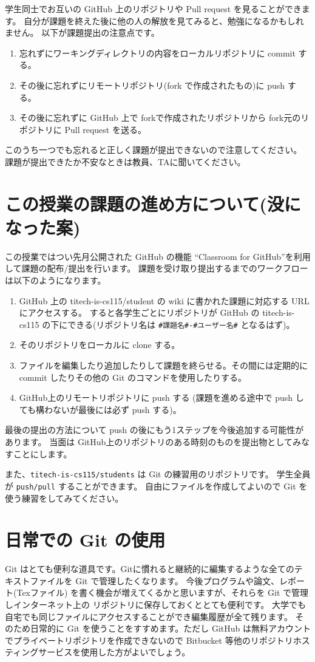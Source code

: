 \documentclass[a4paper]{article}
\begin{document}
学生同士でお互いの GitHub 上のリポジトリや Pull request を見ることができます。
自分が課題を終えた後に他の人の解放を見てみると、勉強になるかもしれません。
以下が課題提出の注意点です。
\begin{enumerate}
\item 忘れずにワーキングディレクトリの内容をローカルリポジトリに commit する。
\item その後に忘れずにリモートリポジトリ(fork で作成されたもの)に push する。
\item その後に忘れずに GitHub 上で forkで作成されたリポジトリから fork元のリポジトリに Pull request を送る。
\end{enumerate}
このうち一つでも忘れると正しく課題が提出できないので注意してください。
課題が提出できたか不安なときは教員、TAに聞いてください。


\section{この授業の課題の進め方について(没になった案)}
この授業ではつい先月公開された GitHub の機能 ``Classroom for GitHub''を利用して課題の配布/提出を行います。
課題を受け取り提出するまでのワークフローは以下のようになります。
\begin{enumerate}
\item GitHub 上の titech-is-cs115/student の wiki に書かれた課題に対応する URL にアクセスする。
すると各学生ごとにリポジトリが GitHub の titech-is-cs115 の下にできる(リポジトリ名は \verb|#課題名#-#ユーザー名#| となるはず)。
\item そのリポジトリをローカルに clone する。
\item ファイルを編集したり追加したりして課題を終らせる。その間には定期的に commit したりその他の Git のコマンドを使用したりする。
\item GitHub上のリモートリポジトリに push する (課題を進める途中で push しても構わないが最後には必ず push する)。
\end{enumerate}
最後の提出の方法について push の後にもう1ステップを今後追加する可能性があります。
当面は GitHub上のリポジトリのある時刻のものを提出物としてみなすことにします。

また、\texttt{titech-is-cs115/students} は Git の練習用のリポジトリです。
学生全員が \texttt{push/pull} することができます。
自由にファイルを作成してよいので Git を使う練習をしてみてください。
\fi

\section*{日常での Git の使用}
Git はとても便利な道具です。Gitに慣れると継続的に編集するような全てのテキストファイルを Git で管理したくなります。
今後プログラムや論文、レポート(Texファイル) を書く機会が増えてくるかと思いますが、それらを Git で管理しインターネット上の
リポジトリに保存しておくととても便利です。
大学でも自宅でも同じファイルにアクセスすることができ編集履歴が全て残ります。
そのため日常的に Git を使うことをすすめます。ただし GitHub は無料アカウントでプライベートリポジトリを作成できないので
Bitbucket 等他のリポジトリホスティングサービスを使用した方がよいでしょう。
\end{document}
